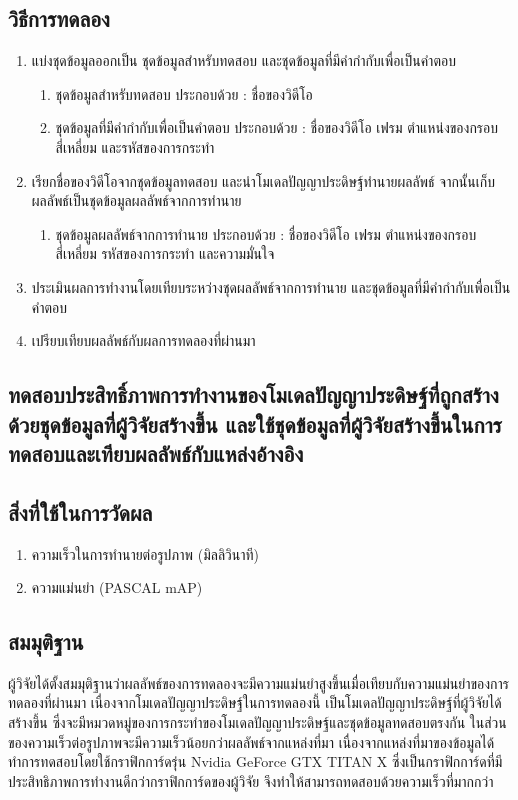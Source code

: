 \subsection*{วิธีการทดลอง}
	\begin{enumerate}
		\setlength\itemsep{-0.25em}
		\item แบ่งชุดข้อมูลออกเป็น ชุดข้อมูลสำหรับทดสอบ และชุดข้อมูลที่มีคำกำกับเพื่อเป็นคำตอบ
			\begin{enumerate}
				\setlength\itemsep{-0.25em}
				\item ชุดข้อมูลสำหรับทดสอบ ประกอบด้วย : ชื่อของวิดีโอ
				\item ชุดข้อมูลที่มีคำกำกับเพื่อเป็นคำตอบ ประกอบด้วย : ชื่อของวิดีโอ เฟรม ตำแหน่งของกรอบสี่เหลี่ยม และรหัสของการกระทำ
			\end{enumerate}
		\item เรียกชื่อของวิดีโอจากชุดข้อมูลทดสอบ และนำโมเดลปัญญาประดิษฐ์ทำนายผลลัพธ์ จากนั้นเก็บผลลัพธ์เป็นชุดข้อมูลผลลัพธ์จากการทำนาย
			\begin{enumerate}
				\setlength\itemsep{-0.25em}
				\item ชุดข้อมูลผลลัพธ์จากการทำนาย ประกอบด้วย : ชื่อของวิดีโอ เฟรม ตำแหน่งของกรอบสี่เหลี่ยม รหัสของการกระทำ และความมั่นใจ
			\end{enumerate}
		\item ประเมินผลการทำงานโดยเทียบระหว่างชุดผลลัพธ์จากการทำนาย และชุดข้อมูลที่มีคำกำกับเพื่อเป็นคำตอบ	
		\item เปรียบเทียบผลลัพธ์กับผลการทดลองที่ผ่านมา
\end{enumerate}
\clearpage
\subsection{ทดสอบประสิทธิ์ภาพการทำงานของโมเดลปัญญาประดิษฐ์ที่ถูกสร้างด้วยชุดข้อมูลที่ผู้วิจัยสร้างขึ้น และใช้ชุดข้อมูลที่ผู้วิจัยสร้างขึ้นในการทดสอบและเทียบผลลัพธ์กับแหล่งอ้างอิง}
\subsection*{สิ่งที่ใช้ในการวัดผล}
	\begin{enumerate}
		\setlength\itemsep{-0.25em}
		\item ความเร็วในการทำนายต่อรูปภาพ (มิลลิวินาที)
		\item ความแม่นยำ (PASCAL mAP)
	\end{enumerate}
\subsection*{สมมุติฐาน}ผู้วิจัยได้ตั้งสมมุติฐานว่าผลลัพธ์ของการทดลองจะมีความแม่นยำสูงขึ้นเมื่อเทียบกับความแม่นยำของการทดลองที่ผ่านมา เนื่องจากโมเดลปัญญาประดิษฐ์ในการทดลองนี้ 
เป็นโมเดลปัญญาประดิษฐ์ที่ผู้วิจัยได้สร้างขึ้น ซึ่งจะมีหมวดหมู่ของการกระทำของโมเดลปัญญาประดิษฐ์และชุดข้อมูลทดสอบตรงกัน ในส่วนของความเร็วต่อรูปภาพจะมีความเร็วน้อยกว่าผลลัพธ์จากแหล่งที่มา 
เนื่องจากแหล่งที่มาของข้อมูลได้ทำการทดสอบโดยใช้กราฟิกการ์ดรุ่น Nvidia GeForce GTX TITAN X ซึ่งเป็นกราฟิกการ์ดที่มีประสิทธิภาพการทำงานดีกว่ากราฟิกการ์ดของผู้วิจัย จึงทำให้สามารถทดสอบด้วยความเร็วที่มากกว่า

